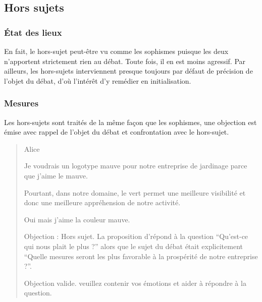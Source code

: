 \subsection{Hors sujets}
\subsubsection{État des lieux}
En fait, le hors-sujet peut-être vu comme les sophismes puisque les deux n’apportent strictement rien au débat. Toute fois, il en est moins agressif. Par ailleurs, les hors-sujets interviennent presque toujours par défaut de précision de l’objet du débat, d’où l’intérêt d’y remédier en initialisation.

\subsubsection{Mesures}
Les hors-sujets sont traités de la même façon que les sophismes, une objection est émise avec rappel de l’objet du débat et confrontation avec le hors-sujet.

\begin{quote}
  \begin{drama}{0cm}{0cm}{Alice}

    \Aspeaks       Je voudrais un logotype mauve pour notre entreprise de jardinage parce que j’aime le mauve.

    \Bspeaks       Pourtant, dans notre domaine, le vert permet une meilleure visibilité et donc une meilleure appréhension de notre activité.

    \Aspeaks       Oui mais j’aime la couleur mauve.

    \Bspeaks       Objection : Hors sujet. La proposition d’\A répond à la question \enquote{Qu’est-ce qui nous plait le plus ?} alors que le sujet du débat était explicitement \enquote{Quelle mesures seront les plus favorable à la prospérité de notre entreprise ?}.

    \Arbitrespeaks Objection valide. \A veuillez contenir vos émotions et aider à répondre à la question.

  \end{drama}
\end{quote}
